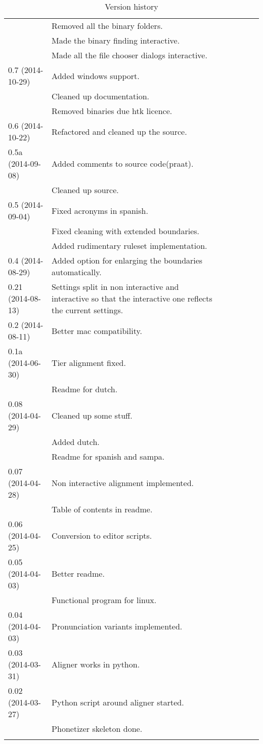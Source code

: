 \begin{longtable}{l|l|l|l|l|l|l}
\begin{longtable}{|p{0.22\linewidth}p{0.8\linewidth}|}
	\hline
	0.8 (2014-10-31) & \tabitem Removed all the binary folders.\\
		& \tabitem Made the binary finding interactive.\\
		& \tabitem Made all the file chooser dialogs interactive.\\
	\hline
	0.7 (2014-10-29) & \tabitem Added windows support.\\
		&	\tabitem Cleaned up documentation.\\
		& \tabitem Removed binaries due htk licence.\\
	\hline
	0.6 (2014-10-22) & \tabitem Refactored and cleaned up the source.\\
	\hline
	0.5a (2014-09-08) & \tabitem Added comments to source code(praat).\\
		& \tabitem Cleaned up source.\\
	\hline
	0.5 (2014-09-04) & \tabitem Fixed acronyms in spanish.\\
		& \tabitem Fixed cleaning with extended boundaries.\\
		& \tabitem Added rudimentary ruleset implementation.\\
	\hline
	0.4 (2014-08-29) & \tabitem Added option for enlarging the boundaries
automatically.\\
	\hline
	0.21 (2014-08-13) & \tabitem Settings split in non interactive and
interactive so that the interactive one reflects the current settings.\\
	\hline
	0.2 (2014-08-11) & \tabitem Better mac compatibility.\\
	\hline
	0.1a (2014-06-30) & \tabitem Tier alignment fixed.\\
		& \tabitem Readme for dutch.\\
	\hline
	0.08 (2014-04-29) & \tabitem Cleaned up some stuff.\\
		& \tabitem Added dutch.\\
		& \tabitem Readme for spanish and sampa.\\
	\hline
	0.07 (2014-04-28) & \tabitem Non interactive alignment implemented.\\
		& \tabitem Table of contents in readme.\\
	\hline
	0.06 (2014-04-25) & \tabitem Conversion to editor scripts.\\
	\hline
	0.05 (2014-04-03) & \tabitem Better readme.\\
		& \tabitem Functional program for linux.\\
	\hline
	0.04 (2014-04-03) & \tabitem Pronunciation variants implemented.\\
	\hline
	0.03 (2014-03-31) & \tabitem Aligner works in python.\\
	\hline
	0.02 (2014-03-27) & \tabitem Python script around aligner started.\\
		& \tabitem Phonetizer skeleton done.\\
	\hline
	\caption{Version history}
\end{longtable}





